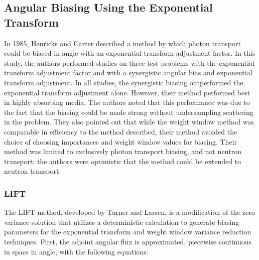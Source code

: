 \subsection{Angular Biasing Using the Exponential Transform}

In 1985, Henricks and Carter \cite{hendricks_anisotropic_1985} described a
method by which
photon transport could be biased in angle with an exponential transform
adjustment factor.
In this study, the authors performed studies on three test problems with the
exponential
transform adjustment factor and with a synergistic angular bias and exponential
transform
adjustment.
In all studies, the synergistic biasing outperformed the exponential transform
adjustment
alone.
However, their method performed best in highly absorbing media.
The authors noted that this performance was due to the fact that the biasing
could be made
strong without undersampling scattering in the problem.
They also pointed out that while the weight window method was comparable in
efficiency to the
method described, their method avoided the choice of choosing importances and
weight window
values for biasing. Their method was limited to exclusively photon transport
biasing, and not
neutron transport; the authors were optimistic that the method could be extended
to neutron
transport.

\subsubsection{LIFT}

The LIFT \cite{turner_automatic_1997, turner_automatic_1997-1} method, developed by Turner and Larsen, is
a modification
of the zero variance solution that utilizes a deterministic calculation to
generate biasing
parameters for the exponential transform and weight window variance reduction
techniques.
First, the adjoint angular flux is approximated, piecewise continuous in space
in angle,
with the following equations:


